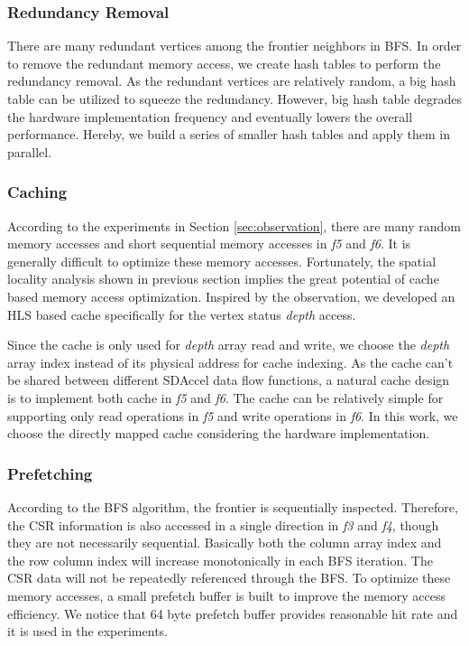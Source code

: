 \subsubsection{Redundancy Removal}
There are many redundant vertices among the frontier neighbors in BFS. 
In order to remove the redundant memory access, we create hash tables 
to perform the redundancy removal. As the redundant vertices are 
relatively random, a big hash table can be utilized to squeeze 
the redundancy. However, big hash table degrades the hardware implementation 
frequency and eventually lowers the overall performance. Hereby, we 
build a series of smaller hash tables and apply them in parallel. 
 
\subsubsection{Caching}
According to the experiments in Section \ref{sec:observation}, 
there are many random memory accesses and short 
sequential memory accesses in \textit{f5} and \textit{f6}. 
It is generally difficult to optimize these memory accesses. Fortunately, 
the spatial locality analysis shown in previous section 
implies the great potential of cache based memory access optimization. 
Inspired by the observation, we developed an HLS based cache specifically 
for the vertex status \textit{depth} access. 

Since the cache is only used for \textit{depth} array read and write, we  
choose the \textit{depth} array index instead of its physical address for cache 
indexing. As the cache can't be shared 
between different SDAccel data flow functions, a natural cache design is 
to implement both cache in \textit{f5} and \textit{f6}. The cache can be relatively simple 
for supporting only read operations in \textit{f5} and write operations in \textit{f6}.  
In this work, we choose the directly mapped cache considering the hardware implementation.  

\subsubsection{Prefetching}
According to the BFS algorithm, the frontier is sequentially inspected. 
Therefore, the CSR information is also accessed in a single direction 
in \textit{f3} and \textit{f4}, though they are not necessarily sequential. Basically 
both the column array index and the row column index will increase 
monotonically in each BFS iteration. The CSR data will not be repeatedly 
referenced through the BFS. To optimize these memory 
accesses, a small prefetch buffer is built to improve the memory access efficiency. 
We notice that 64 byte prefetch buffer provides reasonable hit rate and 
it is used in the experiments.

